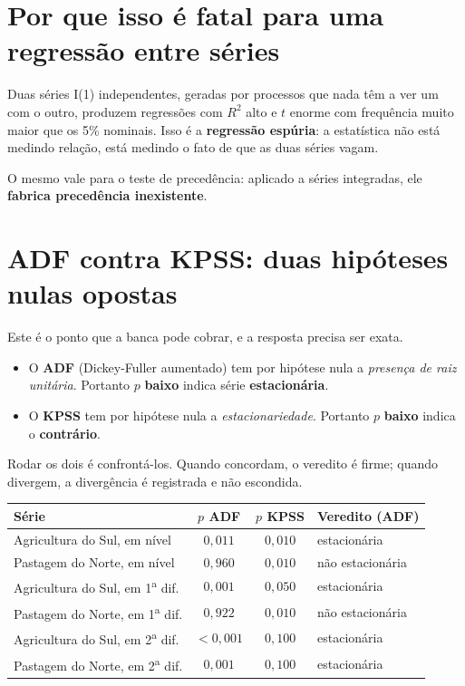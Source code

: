 \section{Por que isso é fatal para uma regressão entre séries}

Duas séries I(1) independentes, geradas por processos que nada têm a ver um com
o outro, produzem regressões com $R^2$ alto e $t$ enorme com frequência muito
maior que os 5\% nominais. Isso é a \textbf{regressão espúria}: a estatística
não está medindo relação, está medindo o fato de que as duas séries vagam.

O mesmo vale para o teste de precedência: aplicado a séries integradas, ele
\textbf{fabrica precedência inexistente}.

\section{ADF contra KPSS: duas hipóteses nulas opostas}

Este é o ponto que a banca pode cobrar, e a resposta precisa ser exata.

\begin{itemize}
\item O \textbf{ADF} (Dickey-Fuller aumentado) tem por hipótese nula a
\emph{presença de raiz unitária}. Portanto $p$ \textbf{baixo} indica série
\textbf{estacionária}.
\item O \textbf{KPSS} tem por hipótese nula a \emph{estacionariedade}. Portanto
$p$ \textbf{baixo} indica o \textbf{contrário}.
\end{itemize}

Rodar os dois é confrontá-los. Quando concordam, o veredito é firme; quando
divergem, a divergência é registrada e não escondida.

\vspace{6pt}
\begin{tabular}{@{}lccl@{}}
\toprule
\textbf{Série} & \textbf{$p$ ADF} & \textbf{$p$ KPSS} & \textbf{Veredito (ADF)} \\
\midrule
Agricultura do Sul, em nível & $0{,}011$ & $0{,}010$ & estacionária \\
Pastagem do Norte, em nível & $0{,}960$ & $0{,}010$ & não estacionária \\
Agricultura do Sul, em 1\textsuperscript{a} dif. & $0{,}001$ & $0{,}050$ & estacionária \\
Pastagem do Norte, em 1\textsuperscript{a} dif. & $0{,}922$ & $0{,}010$ & não estacionária \\
Agricultura do Sul, em 2\textsuperscript{a} dif. & $<0{,}001$ & $0{,}100$ & estacionária \\
Pastagem do Norte, em 2\textsuperscript{a} dif. & $0{,}001$ & $0{,}100$ & estacionária \\
\bottomrule
\end{tabular}

